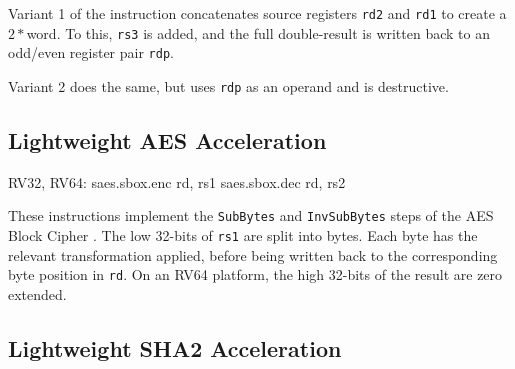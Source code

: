 Variant 1 of the  instruction
concatenates source registers
{\tt rd2}
and
{\tt rd1}
to create a $2*$\XLEN word.
To this,
{\tt rs3} is added,
and the full double-\XLEN result is written back to
an odd/even register pair {\tt rdp}.

Variant 2 does the same, but uses {\tt rdp} as an operand and is
destructive.



\subsection{Lightweight AES Acceleration}

\begin{cryptoisa}
RV32, RV64:
    saes.sbox.enc rd, rs1
    saes.sbox.dec rd, rs2
\end{cryptoisa}

These instructions implement the 
{\tt SubBytes} \cite[Section 5.1.1]{nist:fips:197}
and
{\tt InvSubBytes} \cite[Section 5.3.1]{nist:fips:197}
steps of the AES Block Cipher \cite{nist:fips:197}.
The low 32-bits of {\tt rs1} are split into bytes.
Each byte has the relevant transformation applied, before
being written back to the corresponding byte position in {\tt rd}.
On an RV64 platform, the high 32-bits of the result are zero
extended.





\subsection{Lightweight SHA2 Acceleration}

